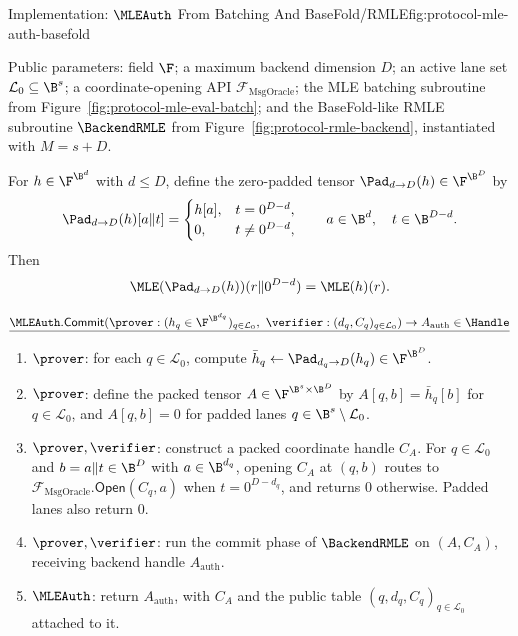 \begin{protocolbox}{Implementation: \(\MLEAuth\) From Batching And BaseFold/RMLE}{fig:protocol-mle-auth-basefold}
\scriptsize\raggedright
\noindent Public parameters: field \(\F\); a maximum backend dimension \(D\);
an active lane set \(\mathcal L_0\subseteq\B^s\); a coordinate-opening API
\(\mathcal F_{\mathrm{MsgOracle}}\); the MLE batching subroutine from
Figure~\ref{fig:protocol-mle-eval-batch}; and the BaseFold-like RMLE subroutine
\(\BackendRMLE\) from Figure~\ref{fig:protocol-rmle-backend}, instantiated
with \(M=s+D\).

\smallskip
\noindent For \(h\in\F^{\B^d}\) with \(d\le D\), define the zero-padded tensor
\(\Pad_{d\to D}(h)\in\F^{\B^D}\) by
\[
  \Pad_{d\to D}(h)[a\Vert t]
  =
  \begin{cases}
    h[a], & t=0^{D-d},\\
    0, & t\ne0^{D-d},
  \end{cases}
  \qquad
  a\in\B^d,\quad t\in\B^{D-d}.
\]
Then
\[
  \MLE(\Pad_{d\to D}(h))(r\Vert0^{D-d})=\MLE(h)(r).
\]

\smallskip
\noindent\(\underline{\MLEAuth.\mathsf{Commit}(\prover:(h_q\in\F^{\B^{d_q}})_{q\in\mathcal L_0},\ \verifier:(d_q,C_q)_{q\in\mathcal L_0})\to A_{\mathrm{auth}}\in\Handle}\)

\smallskip
\begin{enumerate}[leftmargin=0.24in,label=\textbf{B\arabic*.},itemsep=0.06em,topsep=0.06em,parsep=0pt]
  \item \(\prover\): for each \(q\in\mathcal L_0\), compute
        \(\bar h_q\gets\Pad_{d_q\to D}(h_q)\in\F^{\B^D}\).
  \item \(\prover\): define the packed tensor
        \(A\in\F^{\B^s\times\B^D}\) by \(A[q,b]=\bar h_q[b]\) for
        \(q\in\mathcal L_0\), and \(A[q,b]=0\) for padded lanes
        \(q\in\B^s\setminus\mathcal L_0\).
  \item \(\prover,\verifier\): construct a packed coordinate handle \(C_A\).
        For \(q\in\mathcal L_0\) and \(b=a\Vert t\in\B^D\) with
        \(a\in\B^{d_q}\), opening \(C_A\) at \((q,b)\) routes to
        \(\mathcal F_{\mathrm{MsgOracle}}.\mathsf{Open}(C_q,a)\) when \(t=0^{D-d_q}\),
        and returns \(0\) otherwise.  Padded lanes also return \(0\).
  \item \(\prover,\verifier\): run the commit phase of
        \(\BackendRMLE\) on \((A,C_A)\), receiving backend handle
        \(A_{\mathrm{auth}}\).
  \item \(\MLEAuth\): return \(A_{\mathrm{auth}}\), with \(C_A\) and
        the public table \((q,d_q,C_q)_{q\in\mathcal L_0}\) attached to it.
\end{enumerate}


\end{protocolbox}
